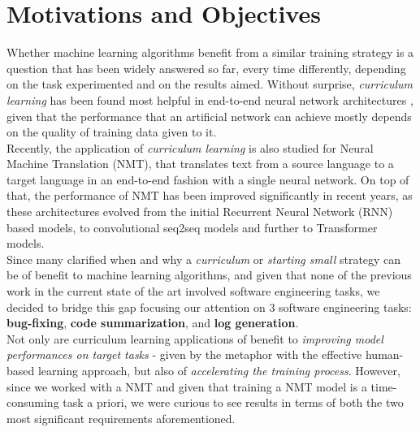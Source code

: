 \section{Motivations and Objectives}
\label{chapter:MAO}
Whether machine learning algorithms benefit from a similar training strategy is a question that has been widely answered so far, 
every time differently, depending on the task experimented and on the results aimed. Without surprise, \textit{curriculum learning}
has been found most helpful in end-to-end neural network architectures \cite{bengio2009curriculum},
given that the performance that an artificial network can achieve mostly depends on the quality of training data given to it.\\
Recently, the application of \textit{curriculum learning} is also studied for Neural Machine Translation (NMT), that translates text from a source
language to a target language in an end-to-end fashion with a single neural network. On top of that, the performance of 
NMT has been improved significantly in recent years, as these architectures evolved from the initial Recurrent Neural Network (RNN) based models, to convolutional
seq2seq models and further to Transformer models. \\
\newline
Since many clarified when and why a \textit{curriculum} or \textit{starting small} strategy can be of benefit
to machine learning algorithms, and given that none of the previous work in the current state of the art 
involved software engineering tasks, we decided to bridge this gap focusing our attention on 3 software engineering tasks: \textbf{bug-fixing}, 
\textbf{code summarization}, and \textbf{log generation}.\\
\newline
Not only are curriculum learning applications of benefit to \textit{improving model performances
on target tasks} - given by the metaphor with 
the effective human-based learning approach, but also of \textit{accelerating the training process}.
However, since we worked with a NMT and given that training a NMT model is a time-consuming task a priori, 
we were curious to see results in terms of both the two most significant requirements 
aforementioned. 


